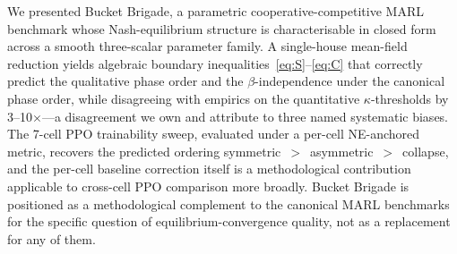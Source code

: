 \documentclass{anvil-paper}
\begin{document}
We presented Bucket Brigade, a parametric cooperative-competitive MARL
benchmark whose Nash-equilibrium structure is characterisable in closed form
across a smooth three-scalar parameter family. A single-house mean-field
reduction yields algebraic boundary inequalities~\eqref{eq:S}--\eqref{eq:C}
that correctly predict the qualitative phase order and the
$\beta$-independence under the canonical phase order, while disagreeing with
empirics on the quantitative $\kappa$-thresholds by 3--10$\times$---a
disagreement we own and attribute to three named systematic biases. The
7-cell PPO trainability sweep, evaluated under a per-cell NE-anchored
metric, recovers the predicted ordering
\textsf{symmetric}~$>$~\textsf{asymmetric}~$>$~\textsf{collapse}, and the
per-cell baseline correction itself is a methodological contribution
applicable to cross-cell PPO comparison more broadly. Bucket Brigade is
positioned as a methodological complement to the canonical MARL benchmarks
for the specific question of equilibrium-convergence quality, not as a
replacement for any of them.



\end{document}
